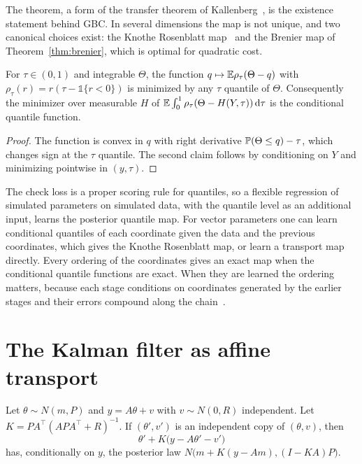 The theorem, a form of the transfer theorem of Kallenberg~\cite[Theorem~6.10]{kallenberg2002}, is the existence statement behind GBC. In several dimensions the map is not unique, and two canonical choices exist: the Knothe Rosenblatt map~\cite{rosenblatt1952,knothe1957} and the Brenier map of Theorem~\ref{thm:brenier}, which is optimal for quadratic cost.

\begin{lemma}
\label{lem:checkloss}
For $\tau\in(0,1)$ and integrable $\Theta$, the function $q\mapsto\E\rho_\tau(\Theta-q)$ with $\rho_\tau(r) = r(\tau-\mathbb{1}\{r<0\})$ is minimized by any $\tau$ quantile of $\Theta$. Consequently the minimizer over measurable $H$ of $\E\int_0^1\rho_\tau(\Theta-H(Y,\tau))\dd\tau$ is the conditional quantile function.
\end{lemma}

\begin{proof}
The function is convex in $q$ with right derivative $\P(\Theta\leq q)-\tau$, which changes sign at the $\tau$ quantile. The second claim follows by conditioning on $Y$ and minimizing pointwise in $(y,\tau)$.
\end{proof}

The check loss is a proper scoring rule for quantiles, so a flexible regression of simulated parameters on simulated data, with the quantile level as an additional input, learns the posterior quantile map. For vector parameters one can learn conditional quantiles of each coordinate given the data and the previous coordinates, which gives the Knothe Rosenblatt map, or learn a transport map directly. Every ordering of the coordinates gives an exact map when the conditional quantile functions are exact. When they are learned the ordering matters, because each stage conditions on coordinates generated by the earlier stages and their errors compound along the chain~\cite{nareklishvili2025review}.

\section{The Kalman filter as affine transport}

\begin{theorem}
\label{thm:kalman_transport}
Let $\theta\sim N(m,P)$ and $y = A\theta+v$ with $v\sim N(0,R)$ independent. Let $K = PA^\top(APA^\top+R)^{-1}$. If $(\theta',v')$ is an independent copy of $(\theta,v)$, then
\[
\theta'+K\big(y-A\theta'-v'\big)
\]
has, conditionally on $y$, the posterior law $N\big(m+K(y-Am),(I-KA)P\big)$.
\end{theorem}

